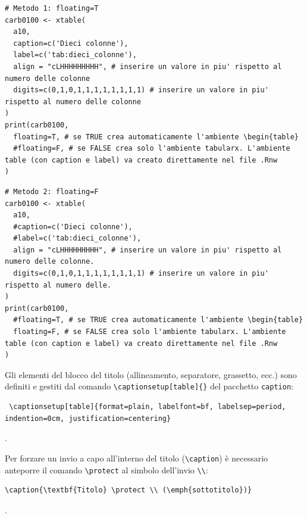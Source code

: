 \documentclass[a4paper, 12pt]{article}\usepackage[]{graphicx}\usepackage[]{color}
\makeatletter
\renewenvironment{table}%
{\renewcommand\familydefault\sfdefault
	\@float{table}}
{\end@float}
\makeatother
\begin{document}
\begin{verbatim}
# Metodo 1: floating=T
carb0100 <- xtable(
  a10,
  caption=c('Dieci colonne'),
  label=c('tab:dieci_colonne'),
  align = "cLHHHHHHHHH", # inserire un valore in piu' rispetto al numero delle colonne
  digits=c(0,1,0,1,1,1,1,1,1,1,1) # inserire un valore in piu' rispetto al numero delle colonne
)
print(carb0100,
  floating=T, # se TRUE crea automaticamente l'ambiente \begin{table}
  #floating=F, # se FALSE crea solo l'ambiente tabularx. L'ambiente table (con caption e label) va creato direttamente nel file .Rnw
)
\end{verbatim}


\begin{verbatim}
# Metodo 2: floating=F
carb0100 <- xtable(
  a10,
  #caption=c('Dieci colonne'),
  #label=c('tab:dieci_colonne'),
  align = "cLHHHHHHHHH", # inserire un valore in piu' rispetto al numero delle colonne.
  digits=c(0,1,0,1,1,1,1,1,1,1,1) # inserire un valore in piu' rispetto al numero delle.
)
print(carb0100,
  #floating=T, # se TRUE crea automaticamente l'ambiente \begin{table}
  floating=F, # se FALSE crea solo l'ambiente tabularx. L'ambiente table (con caption e label) va creato direttamente nel file .Rnw
)
\end{verbatim}

Gli elementi del blocco del titolo (allineamento, separatore, grassetto, ecc.) sono definiti e gestiti dal comando \verb|\captionsetup[table]{}| del pacchetto \verb|caption|: 
\begin{verbatim} \captionsetup[table]{format=plain, labelfont=bf, labelsep=period, indention=0cm, justification=centering}\end{verbatim}.

Per forzare un invio a capo all'interno del titolo (\verb|\caption|) è necessario anteporre il comando \verb|\protect| al simbolo dell'invio \verb|\\|:
\begin{verbatim}\caption{\textbf{Titolo} \protect \\ (\emph{sottotitolo})} \end{verbatim}. 

\end{document}
